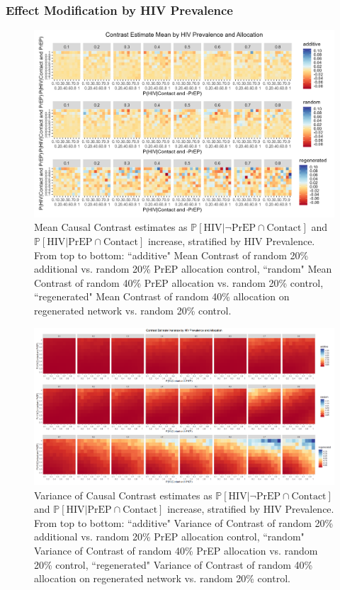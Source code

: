 \documentclass{article}
\theoremstyle{definition}
\begin{document}
\subsubsection{Effect Modification by HIV Prevalence}
\begin{figure}[H]
    \centering
    \includegraphics[width=\linewidth]{Figures/HIV Prevalence Mean plots.png}
    \caption{Mean Causal Contrast estimates as $\mathbb{P}\left[\text{HIV} \vert \neg \text{PrEP} \cap \text{Contact}\right]$ and $\mathbb{P}\left[\text{HIV} \vert \text{PrEP} \cap \text{Contact}\right]$ increase,  stratified by HIV Prevalence. From top to bottom: ``additive" Mean Contrast of random 20\% additional vs. random 20\% PrEP allocation control, ``random" Mean Contrast of random 40\% PrEP allocation vs. random 20\% control, ``regenerated" Mean Contrast of random 40\% allocation on regenerated network vs. random 20\% control.}
    \label{fig:Figure 11}
\end{figure}
\begin{figure}[H]
    \centering
    \includegraphics[width=\linewidth]{Figures/HIV Prevalence Variance plots.png}
    \caption{Variance of Causal Contrast estimates as $\mathbb{P}\left[\text{HIV} \vert \neg \text{PrEP} \cap \text{Contact}\right]$ and $\mathbb{P}\left[\text{HIV} \vert \text{PrEP} \cap \text{Contact}\right]$ increase,  stratified by HIV Prevalence. From top to bottom: ``additive" Variance of Contrast of random 20\% additional vs. random 20\% PrEP allocation control, ``random" Variance of Contrast of random 40\% PrEP allocation vs. random 20\% control, ``regenerated" Variance of Contrast of random 40\% allocation on regenerated network vs. random 20\% control.}
    \label{fig:Figure 12}
\end{figure}
\end{document}
